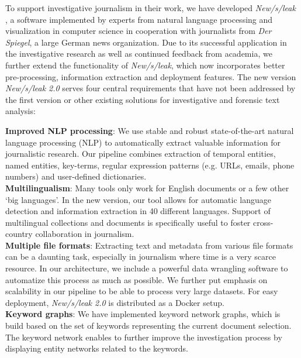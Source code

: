 \documentclass[11pt,a4paper]{article}
\begin{document}
To support investigative journalism in their work, we have developed \emph{New/s/leak} \cite{yimam-EtAl:2016:P16-4}, a software implemented by experts from natural language processing and visualization in computer science in cooperation with journalists from \emph{Der Spiegel}, a large German news organization. Due to its successful application in the investigative research as well as continued feedback from academia, we further extend the functionality of \emph{New/s/leak}, which now incorporates better pre-processing, information extraction and deployment features. 
The new version \emph{New/s/leak 2.0} serves four central requirements that have not been addressed by the first version or other existing solutions for investigative and forensic text analysis:

    \noindent \textbf{Improved NLP processing}:  We use stable and robust state-of-the-art natural language processing (NLP) to automatically extract valuable information for journalistic research. Our pipeline combines extraction of temporal entities, named entities, key-terms, regular expression patterns (e.g. URLs, emails, phone numbers) and user-defined dictionaries.\\
    \noindent \textbf{Multilingualism}: Many tools only work for English documents or a few other `big languages'. In the new version, our tool allows for automatic language detection and information extraction in 40 different languages. Support of multilingual collections and documents is specifically useful to foster cross-country collaboration in journalism. \\
    \noindent \textbf{Multiple file formats}: Extracting text and metadata from various file formats can be a daunting task, especially in journalism where time is a very scarce resource. In our architecture, we include a powerful data wrangling software to automatize this process as much as possible. We further put emphasis on scalability in our pipeline to be able to process very large datasets. For easy deployment, \emph{New/s/leak 2.0} is distributed as a Docker setup.\\
    \noindent \textbf{Keyword graphs}: We have implemented keyword network graphs, which is build based on the set of keywords representing the current document selection. The keyword network enables to further improve the investigation process by displaying entity networks related to the keywords.
\end{document}
